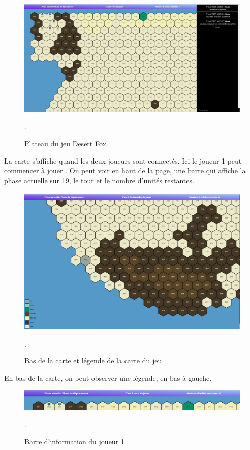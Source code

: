 \begin{figure}[H]
\centering
\includegraphics[scale=0.35]{data/plateau du jeu.jpg}
\caption{Plateau du jeu Desert Fox}.
\end{figure}

La carte s'affiche quand les deux joueurs sont connectés. Ici le joueur 1 peut commencer à jouer
. On peut voir en haut de la page, une barre qui affiche la phase actuelle sur 19, le tour  et le nombre d'unités restantes.


\begin{figure}[H]
\centering
\includegraphics[scale=0.35]{data/justification2.jpg}
\caption{Bas de la carte et légende de la carte du jeu}.
\end{figure}
En bas de la carte, on peut observer une légende, en bas à gauche.\\
\begin{figure}[H]
\centering
\includegraphics[scale=0.4]{data/player 1 acces.jpg}
\caption{Barre d'information du joueur 1}.
\end{figure}


